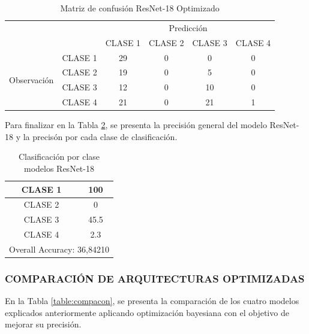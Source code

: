 	\newpage
		\begin{table}[htbp]
			\centering
			\begin{tabular}{|c|l|c|c|c|c|}
				\hline
				\multicolumn{2}{|c|}{\multirow{2}[4]{*}{}} & \multicolumn{4}{c|}{Predicción} \bigstrut\\
				\cline{3-6}    \multicolumn{2}{|c|}{} & CLASE 1 & CLASE 2 & CLASE 3 & CLASE 4 \bigstrut\\
				\hline
				\multirow{4}[8]{*}{\begin{sideways}Observación\end{sideways}} & CLASE 1 & 29     & 0     & 0    & 0 \bigstrut\\
				\cline{2-6}          & CLASE 2 & 19     & 0     & 5    & 0 \bigstrut\\
				\cline{2-6}          & CLASE 3 & 12     & 0     & 10    & 0 \bigstrut\\
				\cline{2-6}          & CLASE 4 & 21     & 0     & 21    & 1 \bigstrut\\
				\hline
			\end{tabular}%
			\caption{Matriz de confusión ResNet-18 Optimizado }
			\label{tab:MC_resnet_OPT}%
		\end{table}%
	Para finalizar en la Tabla \ref{tab:resnetoptclases}, se presenta la precisión general del modelo ResNet-18 y la precisón por cada clase de clasificación.
		\begin{table}[htbp]
			\centering
			\begin{tabular}{|c|c|}
				\hline
				CLASE 1 & 100 \bigstrut\\
				\hline
				CLASE 2 & 0 \bigstrut\\
				\hline
				CLASE 3 & 45.5 \bigstrut\\
				\hline
				CLASE 4 & 2.3 \bigstrut\\
				\hline
				\multicolumn{2}{|c|}{Overall Accuracy: 36,84210} \bigstrut\\
				\hline
			\end{tabular}%
			\caption{Clasificación por clase modelos ResNet-18}
			\label{tab:resnetoptclases}%
		\end{table}%
	
	
	\subsubsection{\MakeUppercase{Comparación de Arquitecturas Optimizadas}}
		
		En la Tabla \ref{table:compacon}, se presenta la comparación de los cuatro modelos explicados anteriormente aplicando optimización bayesiana con el objetivo de mejorar su precisión.
		
